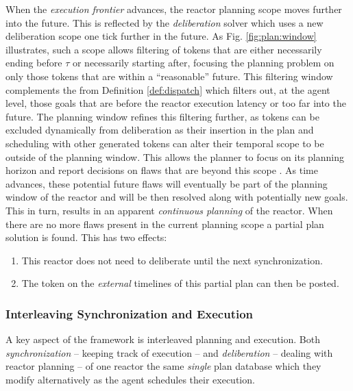 When the {\em execution frontier} advances, the reactor planning scope
moves further into the future. This is reflected by the {\em
  deliberation} solver which uses a new deliberation scope one tick
further in the future. As Fig. \ref{fig:plan:window} illustrates, such
a scope allows filtering of tokens that are either necessarily ending
before $\tau$ or necessarily starting after, focusing the planning
problem on only those tokens that are within a ``reasonable'' future.
This filtering window complements the  from
Definition \ref{def:dispatch} which filters out, at the agent level,
those goals that are before the reactor execution latency or too far
into the future.  The planning window refines this filtering further,
as tokens can be excluded dynamically from deliberation as their
insertion in the plan and scheduling with other generated tokens can
alter their temporal scope to be outside of the planning window.  This
allows the planner to focus on its planning horizon and report
decisions on flaws that are beyond this scope . As time advances, these potential future flaws
will eventually be part of the planning window of the reactor and will
be then resolved along with potentially new goals.  This in turn,
results in an apparent \emph{continuous planning}
 of the reactor. When there are no more flaws
present in the current planning scope a partial plan solution is
found. This has two effects:

\begin{enumerate}

\item This reactor does not need to deliberate until the next
  synchronization. 

\item The token on the {\em external} timelines of this partial plan
  can then be posted. 

\end{enumerate}


\subsubsection{Interleaving Synchronization and Execution}
\label{sec:arch:intertwine}

A key aspect of the \rx framework is interleaved planning and
execution. Both {\em synchronization} -- keeping track of execution --
and {\em deliberation} -- dealing with reactor planning -- of one
reactor  the same {\em single} plan database which
they modify alternatively as the \rx agent schedules their execution.

